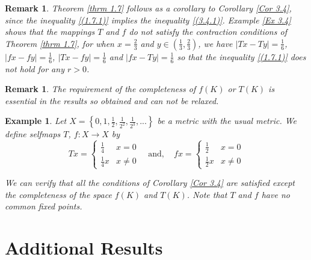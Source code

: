\documentclass[a4paper,12pt,oneside]{article}
\newtheorem{remark}[theorem]{Remark}
\newtheorem{example}[theorem]{Example}
\numberwithin{equation}{section}
\begin{document}
\begin{remark}
    Theorem \eqref{thrm 1.7} follows as a corollary to Corollary \eqref{Cor 3.4}, since the inequality \eqref{(1.7.1)} implies the inequality \eqref{(3.4.1)}. Example \eqref{Ex 3.4} shows that the mappings \(T\) and \(f\) do not satisfy the contraction conditions of Theorem \eqref{thrm 1.7}, for when \(x=\frac{2}{3}\) and \(y\in\left(\frac{1}{3},\frac{2}{3}\right)\), we have \(|Tx-Ty|=\frac{1}{6}\), \(|fx-fy|=\frac{1}{6}\), \(|Tx-fy|=\frac{1}{6}\) and \(|fx-Ty|=\frac{1}{6}\) so that the inequality \eqref{(1.7.1)} does not hold for any \(r>0\).
\end{remark}

\begin{remark}
   The requirement of the completeness of \(f(K)\) or \(T(K)\) is essential in the results so obtained and can not be relaxed.
\end{remark}

\begin{example}
    Let \(X=\left\{0,1,\frac{1}{2},\frac{1}{2^{2}},\frac{1}{2^{3}},...\right\}\) be a metric with the usual metric. We define selfmaps \(T\), \(f:X\to X\) by
    \[
    Tx = \begin{cases} 
        \frac{1}{4} & x = 0 \\
        \frac{1}{4}x & x \neq 0 
    \end{cases} \quad \text{and}, \quad
    fx = \begin{cases} 
        \frac{1}{2} & x = 0 \\
        \frac{1}{2}x & x \neq 0 
    \end{cases}
    \]

We can verify that all the conditions of Corollary \eqref{Cor 3.4} are satisfied except the completeness of the space \(f(K)\) and \(T(K)\). Note that \(T\) and \(f\) have no common fixed points.
\end{example}


\section{Additional Results}
\end{document}
